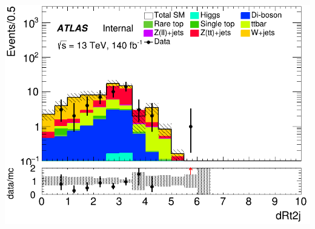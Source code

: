 \documentclass[usenames,dvipsnames]{beamer}
\begin{document}
\begin{frame}
\begin{minipage}{0.32\textwidth}
        \includegraphics[width=\textwidth]{graphics/HHH_met/HHH_met_dRt2j.png}
    \end{minipage}
    
    \vspace{0.5cm} %


\end{frame}
\end{document}

